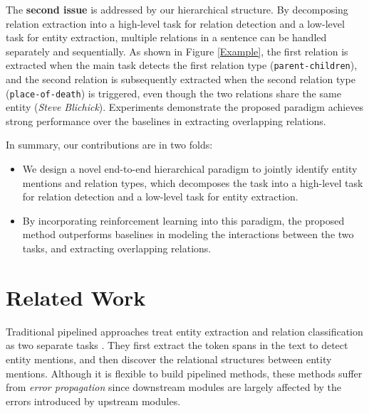 \documentclass[letterpaper]{article} %
\theoremstyle{definition}
\begin{document}
The \textbf{second issue} is addressed by our hierarchical structure. By decomposing relation extraction into a high-level task for relation detection and a low-level task for entity extraction, multiple relations in a sentence can be handled separately and sequentially. As shown in Figure \ref{Example}, the first relation is extracted when the main task detects the first relation type (\texttt{parent-children}), and the second relation is subsequently extracted when the second relation type (\texttt{place-of-death}) is triggered, even though the two relations share the same entity (\textit{Steve Blichick}). Experiments demonstrate the proposed paradigm achieves strong performance over the baselines in extracting overlapping relations.

In summary, our contributions are in two folds:
\begin{itemize}

\item
We design a novel end-to-end hierarchical paradigm to jointly identify entity mentions and relation types, which decomposes the task into a high-level task for relation detection and a low-level task for entity extraction.

\item
By incorporating reinforcement learning into this paradigm, the proposed method outperforms baselines in modeling the interactions between the two tasks, and extracting overlapping relations.
\end{itemize}



\section{Related Work}

Traditional pipelined approaches treat entity extraction and relation classification as two separate tasks \cite{mintz2009distant,gormley2015improved,tang2015line}. They first extract the token spans in the text to detect entity mentions, and then discover the relational structures between entity mentions. Although it is flexible to build pipelined methods, these methods suffer from \textit{error propagation} since downstream modules are largely affected by the errors introduced by upstream modules.
\end{document}
